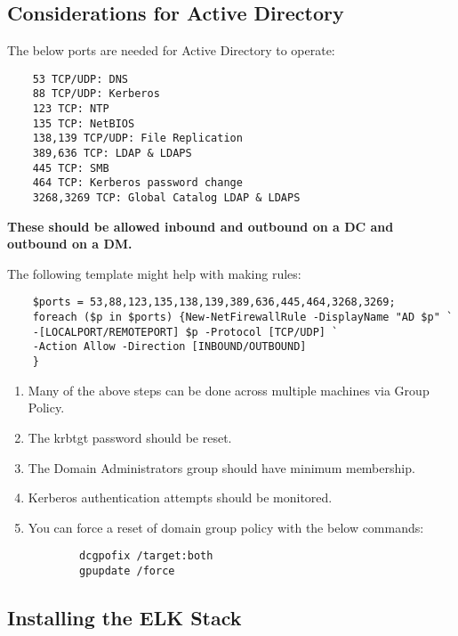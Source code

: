 \documentclass[12pt,letterpaper]{article}
\def\bf#1{\textbf{#1}}
\begin{document}
\subsection{Considerations for Active Directory}
\label{subsec:adcon}

The below ports are needed for Active Directory to operate:
{ \color{iris} \begin{verbatim}
	53 TCP/UDP: DNS
	88 TCP/UDP: Kerberos
	123 TCP: NTP
	135 TCP: NetBIOS
	138,139 TCP/UDP: File Replication
	389,636 TCP: LDAP & LDAPS
	445 TCP: SMB
	464 TCP: Kerberos password change
	3268,3269 TCP: Global Catalog LDAP & LDAPS
\end{verbatim} }
\bf{These should be allowed inbound and outbound on a DC and outbound on a DM.}

The following template might help with making rules:
{ \color{iris} \begin{verbatim}
	$ports = 53,88,123,135,138,139,389,636,445,464,3268,3269;
	foreach ($p in $ports) {New-NetFirewallRule -DisplayName "AD $p" `
	-[LOCALPORT/REMOTEPORT] $p -Protocol [TCP/UDP] `
	-Action Allow -Direction [INBOUND/OUTBOUND]
	}
\end{verbatim} }

\begin{enumerate}
	\item Many of the above steps can be done across multiple machines via Group Policy.
	\item The krbtgt password should be reset.
	\item The Domain Administrators group should have minimum membership.
	\item Kerberos authentication attempts should be monitored.
	\item You can force a reset of domain group policy with the below commands:
		{ \color{iris} \begin{verbatim}
		dcgpofix /target:both
		gpupdate /force
		\end{verbatim} }
\end{enumerate}

\subsection{Installing the ELK Stack}
\end{document}
